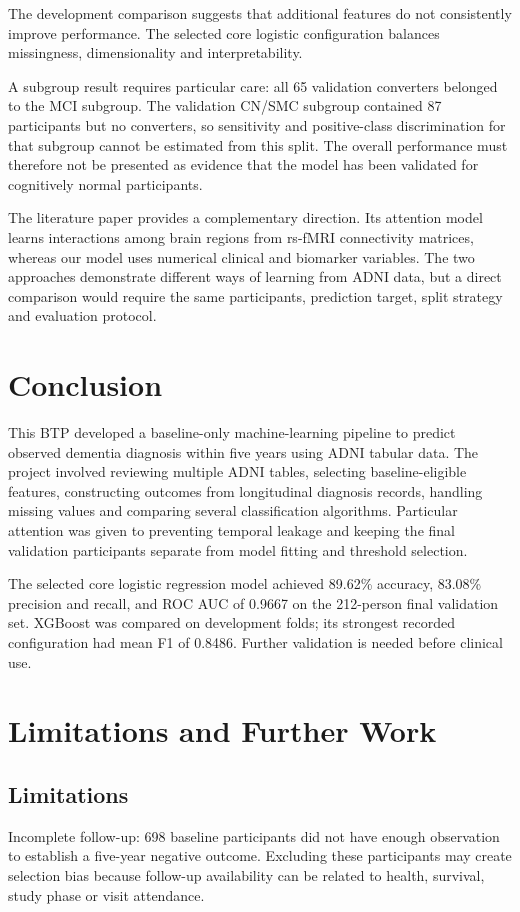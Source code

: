 \documentclass[11pt,a4paper]{article}
\begin{document}
The development comparison suggests that additional features do not consistently improve performance. The selected core logistic configuration balances missingness, dimensionality and interpretability.

A subgroup result requires particular care: all 65 validation converters belonged to the MCI subgroup. The validation CN/SMC subgroup contained 87 participants but no converters, so sensitivity and positive-class discrimination for that subgroup cannot be estimated from this split. The overall performance must therefore not be presented as evidence that the model has been validated for cognitively normal participants.

The literature paper provides a complementary direction. Its attention model learns interactions among brain regions from rs-fMRI connectivity matrices, whereas our model uses numerical clinical and biomarker variables. The two approaches demonstrate different ways of learning from ADNI data, but a direct comparison would require the same participants, prediction target, split strategy and evaluation protocol.

\section{Conclusion}
This BTP developed a baseline-only machine-learning pipeline to predict observed dementia diagnosis within five years using ADNI tabular data. The project involved reviewing multiple ADNI tables, selecting baseline-eligible features, constructing outcomes from longitudinal diagnosis records, handling missing values and comparing several classification algorithms. Particular attention was given to preventing temporal leakage and keeping the final validation participants separate from model fitting and threshold selection.

The selected core logistic regression model achieved 89.62\% accuracy, 83.08\% precision and recall, and ROC AUC of 0.9667 on the 212-person final validation set. XGBoost was compared on development folds; its strongest recorded configuration had mean F1 of 0.8486. Further validation is needed before clinical use.

\section{Limitations and Further Work}
\subsection{Limitations}
Incomplete follow-up: 698 baseline participants did not have enough observation to establish a five-year negative outcome. Excluding these participants may create selection bias because follow-up availability can be related to health, survival, study phase or visit attendance.
\end{document}
